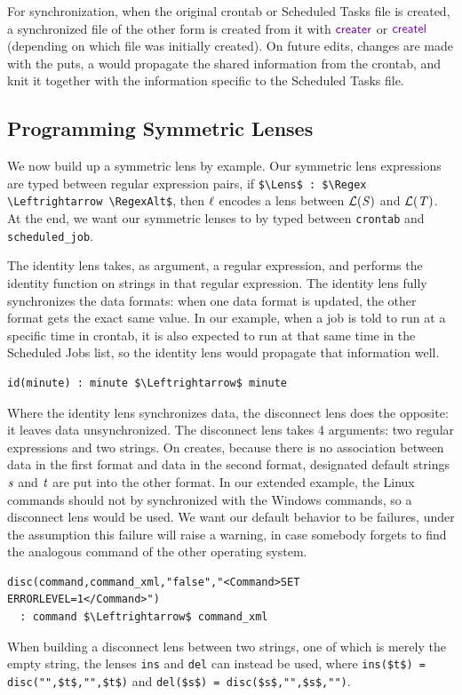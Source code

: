 \documentclass[acmsmall,screen,anonymous]{acmart}
\begin{document}
For synchronization, when the original crontab or Scheduled Tasks file is
created, a synchronized file of the other form is created from it with
$\CreateR$ or $\CreateL$ (depending on which file was initially created). On
future edits, changes are made with the puts, a \PutR would propagate the shared
information from the crontab, and knit it together with the information specific
to the Scheduled Tasks file.

\subsection{Programming Symmetric Lenses} We now build up a symmetric lens by
example. Our symmetric lens expressions are typed between regular expression
pairs, if \lstinline{$\Lens$ : $\Regex \Leftrightarrow \RegexAlt$}, then $\mathit{\ell}$
encodes a lens between $\mathcal{L}(\mathit{S})$ and $\mathcal{L}(\mathit{T})$. At
the end, we want our symmetric lenses to by typed between \lstinline{crontab}
and \lstinline{scheduled_job}.

The identity lens takes, as argument, a regular expression, and performs the
identity function on strings in that regular expression. The identity lens fully
synchronizes the data formats: when one data format is updated, the other format
gets the exact same value. In our example, when a job is told to run at a
specific time in crontab, it is also expected to run at that same time in the
Scheduled Jobs list, so the identity lens would propagate that information well.
%
\begin{lstlisting}
id(minute) : minute $\Leftrightarrow$ minute
\end{lstlisting}
%

Where the identity lens synchronizes data, the disconnect lens does the
opposite: it leaves data unsynchronized. The disconnect lens takes 4 arguments:
two regular expressions and two strings. On creates, because there is no
association between data in the first format and data in the second format,
designated default strings $\mathit{s}$ and $\mathit{t}$ are put into the other
format. In our extended example, the Linux commands should not by synchronized
with the Windows commands, so a disconnect lens would be used. We want our
default behavior to be failures, under the assumption this failure will raise a
warning, in case somebody forgets to find the analogous command of the other
operating system.
%
\begin{lstlisting}
disc(command,command_xml,"false","<Command>SET ERRORLEVEL=1</Command>") 
  : command $\Leftrightarrow$ command_xml
\end{lstlisting}
%
When building a disconnect lens between two strings, one of which is merely the
empty string, the lenses \lstinline{ins} and \lstinline{del} can instead be
used, where \lstinline{ins($t$) = disc("",$t$,"",$t$)} and
\lstinline{del($s$) = disc($s$,"",$s$,"")}.
\end{document}
